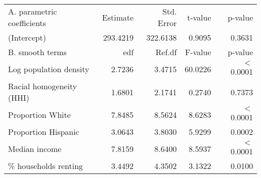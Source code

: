 \begin{table}[ht]
\centering
\begin{tabular}{lrrrr}
   \hline
A. parametric coefficients & Estimate & Std. Error & t-value & p-value \\ 
  (Intercept) & 293.4219 & 322.6138 & 0.9095 & 0.3631 \\ 
   \hline
B. smooth terms & edf & Ref.df & F-value & p-value \\ 
  Log population density & 2.7236 & 3.4715 & 60.0226 & $<$ 0.0001 \\ 
  Racial homogeneity (HHI) & 1.6801 & 2.1741 & 0.2740 & 0.7373 \\ 
  Proportion White & 7.8485 & 8.5624 & 8.6283 & $<$ 0.0001 \\ 
  Proportion Hispanic & 3.0643 & 3.8030 & 5.9299 & 0.0002 \\ 
  Median income & 7.8159 & 8.6400 & 8.5937 & $<$ 0.0001 \\ 
  \% households renting & 3.4492 & 4.3502 & 3.1322 & 0.0100 \\ 
   \hline
\end{tabular}
\caption{ } 
\label{Demographic GAM}
\end{table}
